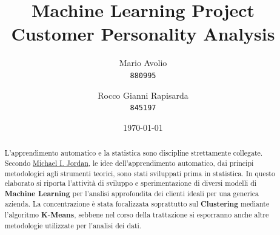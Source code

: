 \documentclass[letterpaper,11pt]{article}
\begin{document}
\title{Machine Learning Project \\\textbf{Customer Personality Analysis}}

\author{
  Mario Avolio\\
  \texttt{880995}
  \and
  Rocco Gianni Rapisarda\\
  \texttt{845197}
}
\date{\today}
\maketitle

\begin{abstract}
L'apprendimento automatico e la statistica sono discipline strettamente collegate. Secondo \href{https://en.wikipedia.org/wiki/Michael\_I.\_Jordan}{Michael I. Jordan}, le idee dell'apprendimento automatico, dai principi metodologici agli strumenti teorici, sono stati sviluppati prima in statistica. In questo elaborato si riporta l'attività di sviluppo e sperimentazione di diversi modelli di \textbf{Machine Learning} per l'analisi approfondita dei clienti ideali per una generica azienda. La concentrazione è stata focalizzata soprattutto sul \textbf{Clustering} mediante l'algoritmo \textbf{K-Means}, sebbene nel corso della trattazione si esporranno anche altre metodologie utilizzate per l'analisi dei dati.
\end{abstract}

\end{document}
